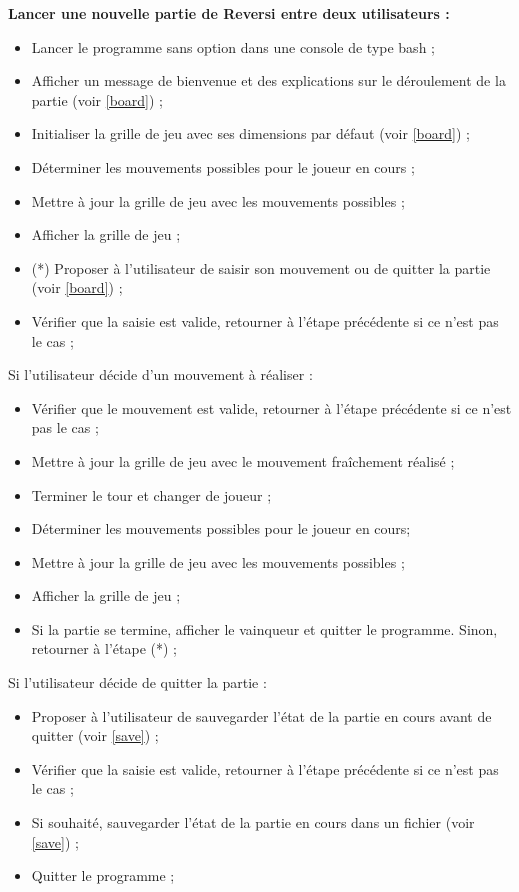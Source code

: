 \documentclass[10pt,a4paper]{article}
\begin{document}
\textbf{Lancer une nouvelle partie de Reversi entre deux utilisateurs :}\\
\begin{itemize}
\item Lancer le programme sans option dans une console de type bash ;
\item Afficher un message de bienvenue et des explications sur le déroulement de la partie (voir \ref{board}) ;\\
\item Initialiser la grille de jeu avec ses dimensions par défaut (voir \ref{board}) ;
\item Déterminer les mouvements possibles pour le joueur en cours ;
\item Mettre à jour la grille de jeu avec les mouvements possibles ;
\item Afficher la grille de jeu ;\\
\item (*) Proposer à l'utilisateur de saisir son mouvement ou de quitter la partie (voir \ref{board}) ;
\item Vérifier que la saisie est valide, retourner à l'étape précédente si ce n'est pas le cas ;\\
\end{itemize}
Si l'utilisateur décide d'un mouvement à réaliser :
\begin{itemize}
\item Vérifier que le mouvement est valide, retourner à l'étape précédente si ce n'est pas le cas ;
\item Mettre à jour la grille de jeu avec le mouvement fraîchement réalisé ;
\item Terminer le tour et changer de joueur ;
\item Déterminer les mouvements possibles pour le joueur en cours;
\item Mettre à jour la grille de jeu avec les mouvements possibles ;
\item Afficher la grille de jeu ;
\item Si la partie se termine, afficher le vainqueur et quitter le programme.
Sinon, retourner à l'étape (*) ;\\
\end{itemize}
Si l'utilisateur décide de quitter la partie :
\begin{itemize}
\item Proposer à l'utilisateur de sauvegarder l'état de la partie en cours avant de quitter (voir \ref{save}) ;
\item Vérifier que la saisie est valide, retourner à l'étape précédente si ce n'est pas le cas ;
\item Si souhaité, sauvegarder l'état de la partie en cours dans un fichier (voir \ref{save}) ;
\item Quitter le programme ;
\end{itemize}
\newpage
\end{document}
